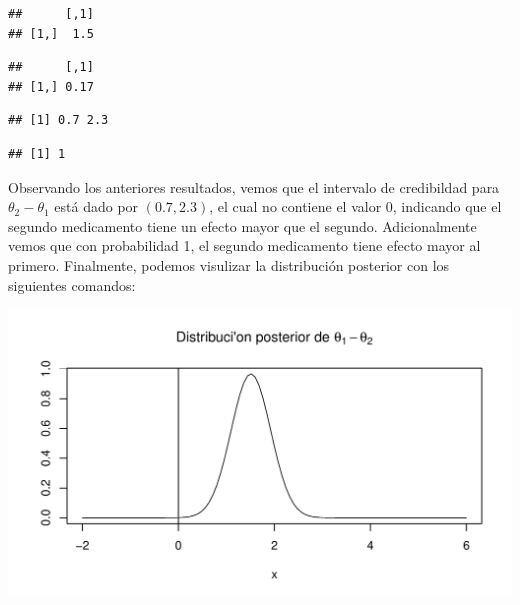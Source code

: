 \begin{Eje}
\begin{knitrout}
\begin{kframe}
\begin{alltt}
\end{alltt}
\begin{verbatim}
##      [,1]
## [1,]  1.5
\end{verbatim}
\begin{alltt}
\end{alltt}
\begin{verbatim}
##      [,1]
## [1,] 0.17
\end{verbatim}
\begin{alltt}
\hlstd{(}\hlstd{(}\hlstd{,}
\end{alltt}
\begin{verbatim}
## [1] 0.7 2.3
\end{verbatim}
\begin{alltt}
\hlopt{-}\hlstd{(} 
\end{alltt}
\begin{verbatim}
## [1] 1
\end{verbatim}
\end{kframe}
\end{knitrout}
Observando los anteriores resultados, vemos que el intervalo de credibildad para $\theta_2-\theta_1$ está dado por $(0.7, 2.3)$, el cual no contiene el valor 0, indicando que el segundo medicamento tiene un efecto mayor que el segundo. Adicionalmente vemos que con probabilidad 1, el segundo medicamento tiene efecto mayor al primero. Finalmente, podemos visulizar la distribución posterior con los siguientes comandos:
\begin{knitrout}
\color{fgcolor}\begin{kframe}
\begin{alltt}
\hlstd{(}  \hlopt{-}\hlstd{,} \hlstd{,} \hlstd{=}
      \hlstd{(}\hlstd{(}\hlstd{, theta[}\hlstd{]} \hlopt{-} \hlstd{theta[}\hlstd{])),}\hlstd{=}\hlstd{)}
\hlstd{(}\hlstd{=}\hlstd{)}
\end{alltt}
\end{kframe}
\includegraphics[width=\maxwidth]{figure/unnamed-chunk-14-1} 


\end{knitrout}
\end{Eje}
